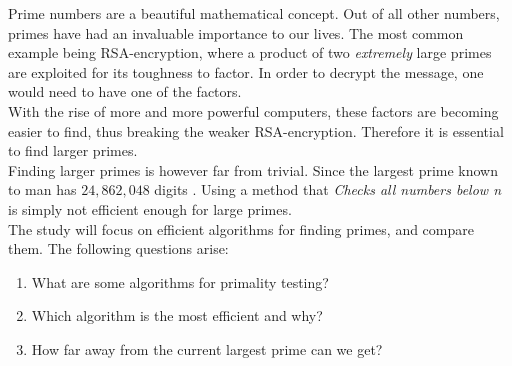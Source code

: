 \documentclass[main.tex]{subfiles}
\begin{document}
Prime numbers are a beautiful mathematical concept. Out of all other numbers,
primes have had an invaluable importance to our lives. The most common example
being RSA-encryption, where a product of two \emph{extremely} large primes are
exploited for its toughness to factor. In order to decrypt the message, one
would need to have one of the factors. \\

With the rise of more and more powerful computers, these factors are becoming
easier to find, thus breaking the weaker RSA-encryption. Therefore it
is essential to find larger primes. \\

Finding larger primes is however far from trivial. Since the largest prime known
to man has $24,862,048$ digits \cite{prime:largest_digits}. Using a method
that \emph{Checks all numbers below n} is simply not efficient enough for large
primes. \\

The study will focus on efficient algorithms for finding primes, and compare
them. The following questions arise:

\begin{enumerate}
\item What are some algorithms for primality testing?
\item Which algorithm is the most efficient and why?
\item How far away from the current largest prime can we get?
\end{enumerate}
\end{document}
